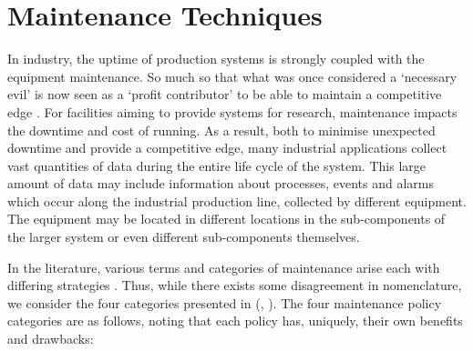 \documentclass[10pt,oneside]{report}
\renewcommand{\citet}[1]{\citeauthor{#1}, \citeyear{#1}}
\begin{document}
\section{Maintenance Techniques}\label{sec:maintenanceTechniques}
In industry, the uptime of production systems is strongly coupled with the equipment maintenance. So much so that what was once considered a `necessary evil' is now seen as a `profit contributor' to be able to maintain a competitive edge \cite{waeyenbergh2002framework, faccio2014industrial}. For facilities aiming to provide systems for research, maintenance impacts the downtime and cost of running. As a result, both to minimise unexpected downtime and provide a competitive edge, many industrial applications collect vast quantities of data during the entire life cycle of the system. This large amount of data may include information about processes, events and alarms \cite{carvalho2019systematic} which occur along the industrial production line, collected by different equipment. The equipment may be located in different locations in the sub-components of the larger system or even different sub-components themselves. 


In the literature, various terms and categories of maintenance arise each with differing strategies \cite{susto2012predictive, mobley2002introduction, susto2016dealing}. Thus, while there exists some disagreement in nomenclature, we consider the four categories presented in (\citet{susto2012predictive}). The four maintenance policy categories are as follows, noting that each policy has, uniquely, their own benefits and drawbacks:
\end{document}
